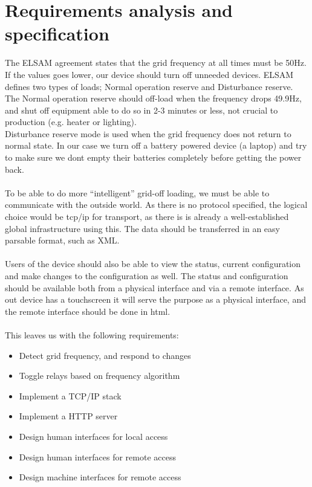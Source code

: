 \chapter[Requirements]{Requirements analysis and specification}
\label{chap:requirements}
The ELSAM agreement states that the grid frequency at all times must be 50Hz. If the values goes lower, our device should turn off unneeded devices. ELSAM defines two types of loads; Normal operation reserve and Disturbance reserve.\\
The Normal operation reserve should off-load when the frequency drops 49.9Hz, and shut off equipment able to do so in 2-3 minutes or less, not crucial to production (e.g. heater or lighting).\\ 
Disturbance reserve mode is used when the grid frequency does not return to normal state. In our case we turn off a battery powered device (a laptop) and try to make sure we dont empty their batteries completely before getting the power back.\\\\

To be able to do more ``intelligent'' grid-off loading, we must be able to communicate with the outside world. As there is no protocol specified, the logical choice would be tcp/ip for transport, as there is is already a well-established global infrastructure using this. The data should be transferred in an easy parsable format, such as XML.\\\\
Users of the device should also be able to view the status, current configuration and make changes to the configuration as well. The status and configuration should be available both from a physical interface and via a remote interface. As out device has a touchscreen it will serve the purpose as a physical interface, and the remote interface should be done in html.\\\\
This leaves us with the following requirements:
\begin{itemize}
\item Detect grid frequency, and respond to changes
\item Toggle relays based on frequency algorithm
\item Implement a TCP/IP stack
\item Implement a HTTP server
\item Design human interfaces for local access
\item Design human interfaces for remote access
\item Design machine interfaces for remote access
\end{itemize}

